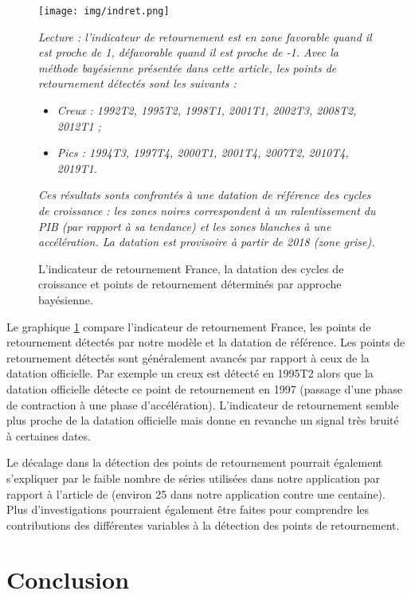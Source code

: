 \documentclass[10pt,french,french]{article}
\begin{document}
\begin{figure}[h]
{\centering
\texttt{[image: img/indret.png]}
\caption{L’indicateur de retournement France, la datation des cycles de croissance et points de retournement déterminés par approche bayésienne.}\label{fig:indret}}
\footnotesize
\emph{%
Lecture : l’indicateur de retournement est en zone favorable quand il est proche de 1, défavorable quand il est proche de -1.
Avec la méthode bayésienne présentée dans cette article, les points de retournement détectés sont les suivants :}
\begin{itemize}
\item \emph{Creux : 1992T2, 1995T2, 1998T1, 2001T1, 2002T3, 2008T2, 2012T1 ;}
\item \emph{Pics : 1994T3, 1997T4, 2000T1, 2001T4, 2007T2, 2010T4, 2019T1.}
\end{itemize}
\emph{Ces résultats sonts confrontés à une datation de référence des cycles de croissance : les zones noires correspondent à un ralentissement du PIB (par rapport à sa tendance) et les zones blanches à une accélération. La datation est provisoire à partir de 2018 (zone grise).}
\end{figure}

Le graphique \ref{fig:indret} compare l'indicateur de retournement France, les points de retournement détectés par notre modèle et la datation de référence.
Les points de retournement détectés sont généralement avancés par rapport à ceux de la datation officielle.
Par exemple un creux est détecté en 1995T2 alors que la datation officielle détecte ce point de retournement en 1997 (passage d'une phase de contraction à une phase d'accélération).
L'indicateur de retournement semble plus proche de la datation officielle mais donne en revanche un signal très bruité à certaines dates.

Le décalage dans la détection des points de retournement pourrait également s'expliquer par le faible nombre de séries utilisées dans notre application par rapport à l'article de \cite{Kaufmann} (environ 25 dans notre application contre une centaine).
Plus d'investigations pourraient également être faites pour comprendre les contributions des différentes variables à la détection des points de retournement.

\hypertarget{conclusion}{%
\section{Conclusion}\label{conclusion}}
\end{document}
